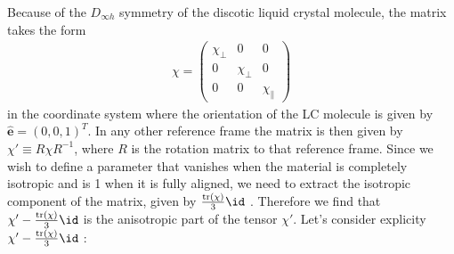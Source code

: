 Because of the $D_{\infty h}$ symmetry of the discotic liquid crystal molecule, the matrix takes the form
\begin{align}
   \chi = \begin{pmatrix}
    \chi_\perp&0&0\\
    0&\chi_\perp&0\\
    0&0&\chi_\parallel
    \end{pmatrix}
\end{align}
in the coordinate system where the orientation of the LC molecule is given by $\hat{\mathbf{e}}=(0,0,1)^T$.
In any other reference frame the matrix is then given by $\chi' \equiv R\chi R^{-1}$, where $R$ is the rotation matrix to that reference frame. Since we wish to define a parameter that vanishes when the material is completely isotropic and is 1 when it is fully aligned, we need to extract the isotropic component of the matrix, given by  $\frac{\mathrm{tr}(\chi)}{3}\id$ . Therefore we find that  $\chi' - \frac{\mathrm{tr}(\chi)}{3}\id$ is the anisotropic part of the tensor $\chi'$. Let's consider explicity $\chi' - \frac{\mathrm{tr}(\chi)}{3}\id$ :
